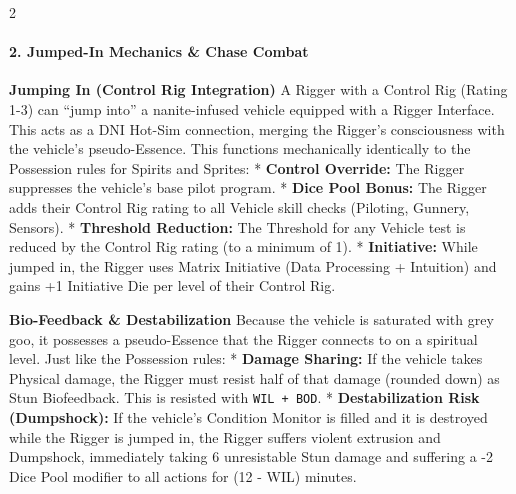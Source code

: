 \documentclass[
  oneside]{article}
\begin{document}
\begin{multicols}{2}

\hypertarget{jumped-in-mechanics-chase-combat}{%
\paragraph{2. Jumped-In Mechanics \& Chase
Combat}\label{jumped-in-mechanics-chase-combat}}

\textbf{Jumping In (Control Rig Integration)} A
Rigger with a Control Rig (Rating 1-3) can ``jump
into'' a nanite-infused vehicle equipped with a
Rigger Interface. This acts as a DNI Hot-Sim
connection, merging the Rigger's consciousness
with the vehicle's pseudo-Essence. This functions
mechanically identically to the Possession rules
for Spirits and Sprites: * \textbf{Control
Override:} The Rigger suppresses the vehicle's
base pilot program. * \textbf{Dice Pool Bonus:}
The Rigger adds their Control Rig rating to all
Vehicle skill checks (Piloting, Gunnery, Sensors).
* \textbf{Threshold Reduction:} The Threshold for
any Vehicle test is reduced by the Control Rig
rating (to a minimum of 1). * \textbf{Initiative:}
While jumped in, the Rigger uses Matrix Initiative
(Data Processing + Intuition) and gains +1
Initiative Die per level of their Control Rig.

\textbf{Bio-Feedback \& Destabilization} Because
the vehicle is saturated with grey goo, it
possesses a pseudo-Essence that the Rigger
connects to on a spiritual level. Just like the
Possession rules: * \textbf{Damage Sharing:} If
the vehicle takes Physical damage, the Rigger must
resist half of that damage (rounded down) as Stun
Biofeedback. This is resisted with
\texttt{WIL\ +\ BOD}. * \textbf{Destabilization
Risk (Dumpshock):} If the vehicle's Condition
Monitor is filled and it is destroyed while the
Rigger is jumped in, the Rigger suffers violent
extrusion and Dumpshock, immediately taking 6
unresistable Stun damage and suffering a -2 Dice
Pool modifier to all actions for (12 - WIL)
minutes.


\end{multicols}
\end{document}
